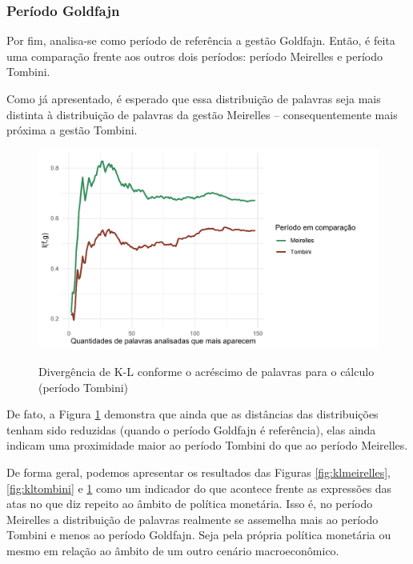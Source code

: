 \subsubsection*{Período Goldfajn}

Por fim, analisa-se como período de referência a gestão Goldfajn. Então, é feita uma comparação frente aos outros dois períodos: período Meirelles e período Tombini.

Como já apresentado, é esperado que essa distribuição de palavras seja mais distinta à distribuição de palavras da gestão Meirelles -- consequentemente mais próxima a gestão Tombini.

\begin{figure}[!h]
    \centering
    \caption{Divergência de K-L conforme o acréscimo de palavras para o cálculo (período Tombini)}
    \includegraphics[width=\textwidth]{capitulos/figures/klgoldfajn.pdf}
    \label{fig:klgoldfajn}
\end{figure}

De fato, a Figura \ref{fig:klgoldfajn} demonstra que ainda que as distâncias das distribuições tenham sido reduzidas (quando o período Goldfajn é referência), elas ainda indicam uma proximidade maior ao período Tombini do que ao período Meirelles.

De forma geral, podemos apresentar os resultados das Figuras \ref{fig:klmeirelles}, \ref{fig:kltombini} e \ref{fig:klgoldfajn} como um indicador do que acontece frente as expressões das atas no que diz repeito ao âmbito de política monetária. Isso é, no período Meirelles a distribuição de palavras realmente se assemelha mais ao período Tombini e menos ao período Goldfajn. Seja pela própria política monetária ou mesmo em relação ao âmbito de um outro cenário macroeconômico.

